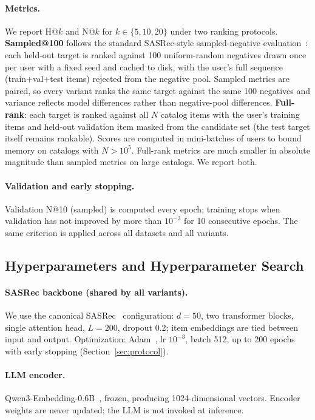 \documentclass{article}
\begin{document}
\paragraph{Metrics.} We report H@$k$ and N@$k$ for $k \in \{5,
10, 20\}$ under two ranking protocols. \textbf{Sampled@100} follows
the standard SASRec-style sampled-negative
evaluation~\citep{kang2018sasrec}: each held-out target is ranked
against 100 uniform-random negatives drawn once per user with a
fixed seed and cached to disk, with the user's full sequence
(train+val+test items) rejected from the negative pool. Sampled
metrics are paired, so every variant ranks the same target against
the same 100 negatives and variance reflects model differences
rather than negative-pool differences. \textbf{Full-rank}: each
target is ranked against all $N$ catalog items with the user's
training items and held-out validation item masked from the
candidate set (the test target itself remains rankable). Scores
are computed in mini-batches of users to bound memory on catalogs
with $N > 10^5$. Full-rank metrics are much
smaller in absolute magnitude than sampled metrics on large
catalogs. We report both.

\paragraph{Validation and early stopping.} Validation N@10
(sampled) is computed every epoch; training stops when validation
has not improved by more than $10^{-3}$ for 10 consecutive epochs.
The same criterion is applied across all datasets and all variants.

\subsection{Hyperparameters and Hyperparameter Search}
\label{sec:hyperparams}

\paragraph{SASRec backbone (shared by all variants).} We use the
canonical SASRec~\citep{kang2018sasrec} configuration: $d=50$,
two transformer blocks, single attention head, $L=200$, dropout 0.2;
item embeddings are tied between input and output.
Optimization: Adam~\cite{kingma2014adam}, lr $10^{-3}$,
batch 512, up to 200 epochs with early stopping (Section~\ref{sec:protocol}).

\paragraph{LLM encoder.} Qwen3-Embedding-0.6B~\citep{qwen3embed},
frozen, producing 1024-dimensional vectors. Encoder weights are
never updated; the LLM is not invoked at inference.
\end{document}
